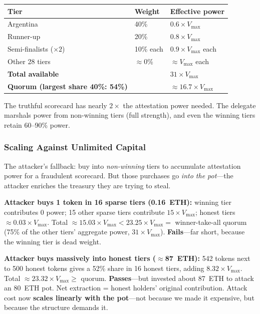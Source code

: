 \documentclass[11pt,a4paper]{article}
\begin{document}
\begin{table}[H]
\centering
\begin{tabular}{lll}
\toprule
\textbf{Tier} & \textbf{Weight} & \textbf{Effective power} \\
\midrule
Argentina & 40\% & $0.6 \times V_{\text{max}}$ \\
Runner-up & 20\% & $0.8 \times V_{\text{max}}$ \\
Semi-finalists ($\times 2$) & 10\% each & $0.9 \times V_{\text{max}}$ each \\
Other 28 tiers & $\approx$0\% & $\approx V_{\text{max}}$ each \\
\midrule
\textbf{Total available} & & $31 \times V_{\text{max}}$ \\
\textbf{Quorum (largest share 40\%: 54\%)} & & $\approx 16.7 \times V_{\text{max}}$ \\
\bottomrule
\end{tabular}
\end{table}

The truthful scorecard has nearly $2\times$ the attestation power needed. The delegate marshals power from non-winning tiers (full strength), and even the winning tiers retain 60--90\% power.

\subsubsection{Scaling Against Unlimited Capital}

The attacker's fallback: buy into \emph{non-winning} tiers to accumulate attestation power for a fraudulent scorecard. But those purchases go \emph{into the pot}---the attacker enriches the treasury they are trying to steal.

\textbf{Attacker buys 1 token in 16 sparse tiers (0.16~ETH):} winning tier contributes 0 power; 15 other sparse tiers contribute $15 \times V_{\text{max}}$; honest tiers $\approx 0.03 \times V_{\text{max}}$. Total $\approx 15.03 \times V_{\text{max}} < 23.25 \times V_{\text{max}} =$ winner-take-all quorum (75\% of the other tiers' aggregate power, $31 \times V_{\text{max}}$). \textbf{Fails}---far short, because the winning tier is dead weight.

\textbf{Attacker buys massively into honest tiers ($\approx$87~ETH):} 542 tokens next to 500 honest tokens gives a 52\% share in 16 honest tiers, adding $8.32 \times V_{\text{max}}$. Total $\approx 23.32 \times V_{\text{max}} \geq$ quorum. \textbf{Passes}---but invested about 87~ETH to attack an 80~ETH pot. Net extraction = honest holders' original contribution. Attack cost now \textbf{scales linearly with the pot}---not because we made it expensive, but because the structure demands it.
\end{document}
